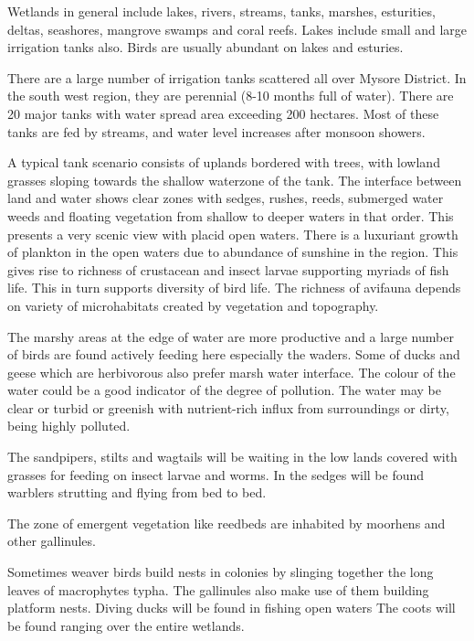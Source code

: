 Wetlands in general include lakes, rivers, streams, 
tanks, marshes, esturities, deltas, seashores, mangrove swamps 
and coral reefs. Lakes include small and large irrigation 
tanks also. Birds are usually abundant on lakes and esturies. 

There are a large number of irrigation tanks scattered 
all over Mysore District. In the south west region, they are 
perennial (8-10 months full of water). There are 20 major 
tanks with water spread area exceeding 200 hectares. Most 
of these tanks are fed by streams, and water level increases 
after monsoon showers. 

A typical tank scenario consists of uplands bordered 
with trees, with lowland grasses sloping towards the shallow 
waterzone of the tank. The interface between land and water 
shows clear zones with sedges, rushes, reeds, submerged water 
weeds and floating vegetation from shallow to deeper waters 
in that order. This presents a very scenic view with placid 
open waters. There is a luxuriant growth of plankton in the 
open waters due to abundance of sunshine in the region. This 
gives rise to richness of crustacean and insect larvae 
supporting myriads of fish life. This in turn supports 
diversity of bird life. The richness of avifauna depends on 
variety of microhabitats created by vegetation and 
topography. 

The marshy areas at the edge of water are more
productive and a large number of birds are found actively 
feeding here especially the waders. Some of ducks and geese 
which are herbivorous also prefer marsh water interface. The 
colour of the water could be a good indicator of the degree 
of pollution. The water may be clear or turbid or greenish 
with nutrient-rich influx from surroundings or dirty, being 
highly polluted. 

\eject

The sandpipers, stilts and wagtails will be waiting in 
the low lands covered with grasses for feeding on insect 
larvae and worms. In the sedges will be found warblers 
strutting and flying from bed to bed. 

The zone of emergent vegetation like reedbeds are 
inhabited by moorhens and other gallinules. 

Sometimes weaver birds build nests in colonies by 
slinging together the long leaves of macrophytes typha. The 
gallinules also make use of them building platform nests. 
Diving ducks will be found in fishing open waters The coots 
will be found ranging over the entire wetlands. 

